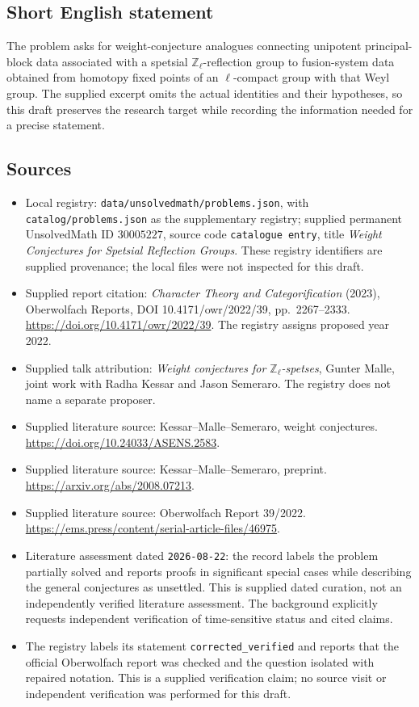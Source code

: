 \documentclass[11pt]{article}
\begin{document}
\subsection{Short English statement}
The problem asks for weight-conjecture analogues connecting unipotent principal-block data associated with a spetsial \(\mathbb Z_\ell\)-reflection group to fusion-system data obtained from homotopy fixed points of an \(\ell\)-compact group with that Weyl group. The supplied excerpt omits the actual identities and their hypotheses, so this draft preserves the research target while recording the information needed for a precise statement.
\subsection{Sources}
\begin{itemize}
\item Local registry: \texttt{data/unsolvedmath/problems.json}, with \texttt{catalog/problems.json} as the supplementary registry; supplied permanent UnsolvedMath ID \(30005227\), source code \texttt{catalogue entry}, title \emph{Weight Conjectures for Spetsial Reflection Groups}. These registry identifiers are supplied provenance; the local files were not inspected for this draft.
\item Supplied report citation: \emph{Character Theory and Categorification} (2023), Oberwolfach Reports, DOI 10.4171/owr/2022/39, pp.~2267--2333. \url{https://doi.org/10.4171/owr/2022/39}. The registry assigns proposed year 2022.
\item Supplied talk attribution: \emph{Weight conjectures for \(\mathbb Z_\ell\)-spetses}, Gunter Malle, joint work with Radha Kessar and Jason Semeraro. The registry does not name a separate proposer.
\item Supplied literature source: Kessar--Malle--Semeraro, weight conjectures. \url{https://doi.org/10.24033/ASENS.2583}.
\item Supplied literature source: Kessar--Malle--Semeraro, preprint. \url{https://arxiv.org/abs/2008.07213}.
\item Supplied literature source: Oberwolfach Report 39/2022. \url{https://ems.press/content/serial-article-files/46975}.
\item Literature assessment dated \texttt{2026-08-22}: the record labels the problem partially solved and reports proofs in significant special cases while describing the general conjectures as unsettled. This is supplied dated curation, not an independently verified literature assessment. The background explicitly requests independent verification of time-sensitive status and cited claims.
\item The registry labels its statement \texttt{corrected\_verified} and reports that the official Oberwolfach report was checked and the question isolated with repaired notation. This is a supplied verification claim; no source visit or independent verification was performed for this draft.
\end{itemize}
\end{document}
